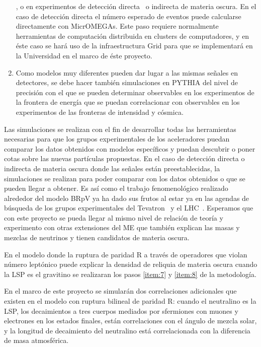 \begin{enumerate}
  \cite{Magro:2003zb,deCampos:2005ri,deCampos:2007bn,deCampos:2008ic,deCampos:2008re},
  o en experimentos de detección directa~\cite{Bernal:2009tt,Bernal:2009jc} o indirecta \cite{Choi:2010xn} de
  materia oscura. En el caso de detección directa el número esperado
  de eventos puede calcularse directamente con MicrOMEGAs. Este paso
  requiere normalmente herramientas de computación distribuida en
  clusters de computadores, y en éste caso se hará uso de la
  infraestructura Grid para que se implementará en la Universidad en
  el marco de éste proyecto.
  \label{item:8}
\item Como modelos muy diferentes pueden dar lugar a las mismas
  señales en detectores, se debe hacer también simulaciones en PYTHIA
  del nivel de precisión con el que se pueden determinar observables
  en los experimentos de la frontera de energía que se puedan
  correlacionar con observables en los experimentos de las fronteras
  de intensidad y cósmica.
  \label{item:9}
\end{enumerate}

Las simulaciones se realizan con el fin de desarrollar todas las
herramientas necesarias para que los grupos experimentales de los
aceleradores puedan comparar los datos obtenidos con modelos
específicos y puedan descubrir o poner cotas sobre las nuevas
partículas propuestas. En el caso de detección directa o indirecta de
materia oscura donde las señales están preestablecidas, la
simulaciones se realizan para poder comparar con los datos obtenidos o
que se pueden llegar a obtener. Es así como el trabajo fenomenológico
realizado alrededor del modelo BRpV ya ha dado sus frutos al estar ya
en las agendas de búsqueda de los grupos experimentales del
Tevatron~\cite{Brigliadori:2008vf} y el LHC~\cite{:2011iu}. Esperamos
que con este proyecto se pueda llegar al mismo nivel de relación de
teoría y experimento con otras extensiones del ME que
también explican las masas y mezclas de neutrinos y tienen candidatos
de materia oscura.



\begin{gravitinodm}
  En el modelo donde la ruptura de paridad R a través de operadores
  que violan número leptónico puede explicar la densidad de reliquia
  de materia oscura cuando la LSP es el gravitino se realizaran los
  pasos \ref{item:7} y \ref{item:8} de la metodología.
\end{gravitinodm}

\begin{brpvlhc}
  En el marco de este proyecto se simularán dos correlaciones
  adicionales que existen en el modelo con ruptura bilineal de paridad R:
  cuando el neutralino es la LSP, los decaimientos a tres cuerpos
  mediados por sfermiones con muones y electrones en los estados
  finales, están correlaciones con el ángulo de mezcla solar, y la
  longitud de decaimiento del neutralino está correlacionada con la
  diferencia de masa atmosférica.
\end{brpvlhc}

